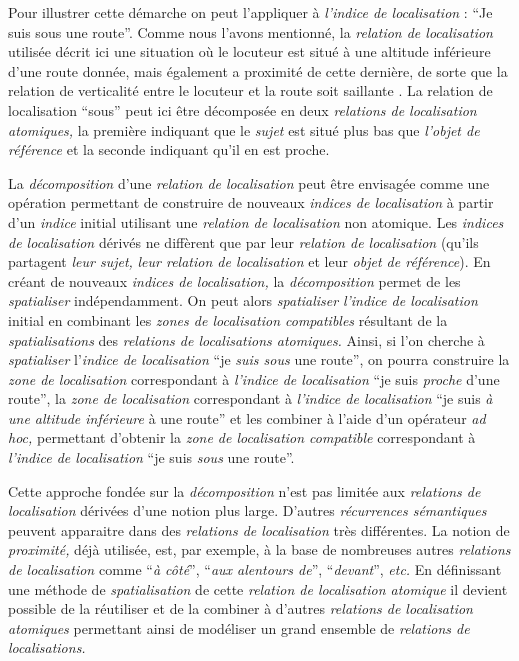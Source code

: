 Pour illustrer cette démarche on peut l'appliquer à \emph{l'indice de
  localisation} : \enquote{Je suis sous une route}. Comme nous l'avons
mentionné, la \emph{relation de localisation} utilisée décrit ici une
situation où le locuteur est situé à une altitude inférieure d'une
route donnée, mais également a proximité de cette dernière, de sorte
que la relation de verticalité entre le locuteur et la route soit
saillante \autocite{Vandeloise1986}. La relation de localisation
\enquote{sous} peut ici être décomposée en deux \emph{relations de
  localisation atomiques,} la première indiquant que le \emph{sujet}
est situé plus bas que \emph{l'objet de référence} et la seconde
indiquant qu'il en est proche.

La \emph{décomposition} d'une \emph{relation de localisation} peut
être envisagée comme une opération permettant de construire de
nouveaux \emph{indices de localisation} à partir d'un \emph{indice}
initial utilisant une \emph{relation de localisation} non
atomique. Les \emph{indices de localisation} dérivés ne diffèrent que
par leur \emph{relation de localisation} (\ie qu'ils partagent
\emph{leur sujet,} \emph{leur relation de localisation} et leur
\emph{objet de référence}). En créant de nouveaux \emph{indices de
  localisation,} la \emph{décomposition} permet de les
\emph{spatialiser} indépendamment. On peut alors \emph{spatialiser}
\emph{l'indice de localisation} initial en combinant les \emph{zones
  de localisation compatibles} résultant de la \emph{spatialisations}
des \emph{relations de localisations atomiques.} Ainsi, si l'on
cherche à \emph{spatialiser} l'\emph{indice de localisation}
\enquote{je \emph{suis sous} une route}, on pourra construire la
\emph{zone de localisation} correspondant à \emph{l'indice de
  localisation} \enquote{je suis \emph{proche} d'une route}, la
\emph{zone de localisation} correspondant à \emph{l'indice de
  localisation} \enquote{je suis \emph{à une altitude inférieure} à
  une route} et les combiner à l'aide d'un opérateur \emph{ad hoc,}
permettant d'obtenir la \emph{zone de localisation compatible}
correspondant à \emph{l'indice de localisation} \enquote{je suis
  \emph{sous} une route}.

Cette approche fondée sur la \emph{décomposition} n'est pas limitée
aux \emph{relations de localisation} dérivées d'une notion plus
large. D'autres \emph{récurrences sémantiques} peuvent apparaitre dans
des \emph{relations de localisation} très différentes. La notion de
\emph{proximité,} déjà utilisée, est, par exemple, à la base de
nombreuses autres \emph{relations de localisation} comme
\enquote{\emph{à côté}}, \enquote{\emph{aux alentours de}},
\enquote{\emph{devant}}, \emph{etc.} En définissant une méthode de
\emph{spatialisation} de cette \emph{relation de localisation
  atomique} il devient possible de la réutiliser et de la combiner à
d'autres \emph{relations de localisation atomiques} permettant ainsi
de modéliser un grand ensemble de \emph{relations de localisations.}


